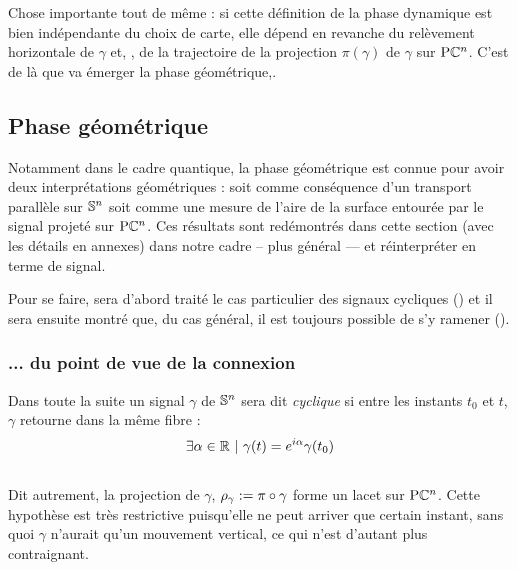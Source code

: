 Chose importante tout de même : si cette définition de la phase dynamique est bien indépendante du choix de carte, elle dépend en revanche du relèvement horizontale de $\gamma$ et, \afortiori, de la trajectoire de la projection $\pi(\gamma)$ de $\gamma$ sur $\PC{n}$. C'est de là que va émerger la phase géométrique,.
\\



\subsection{Phase géométrique}

Notamment dans le cadre quantique, la phase géométrique est connue pour avoir deux interprétations géométriques \cite{bohm_geometric_2003, chruscinski_geometric_2004,faure_introduction_2022} : soit comme conséquence d'un transport parallèle sur $\S{n}$ soit comme une mesure de l'aire de la surface entourée par le signal projeté sur $\PC{n}$. Ces résultats sont redémontrés dans cette section (avec les détails en annexes) dans notre cadre -- plus général --- et réinterpréter en terme de signal.

Pour se faire, sera d'abord traité le cas particulier des signaux cycliques () et il sera ensuite montré que, du cas général, il est toujours possible de s'y ramener ().
\skipl



\subsubsection{... du point de vue de la connexion} \label{subsec:phase_g2cycl}

Dans toute la suite un signal $\gamma$ de $\S{n}$ sera dit \emph{cyclique} si entre les instants $t_0$ et $t$, $\gamma$ retourne dans la même fibre :
\begin{equation}\label{eq:def2cycl}
	\exists \alpha \in\R\ |\ \gamma(t) = e^{i\alpha}\gamma(t_0)
\end{equation}
\\
Dit autrement, la projection de $\gamma$, $\rho_\gamma \defeq \pi\circ\gamma$ forme un lacet sur $\PC{n}$.
Cette hypothèse est très restrictive puisqu'elle ne peut arriver que certain instant, sans quoi $\gamma$ n'aurait qu'un mouvement vertical, ce qui n'est d'autant plus contraignant.
\\

